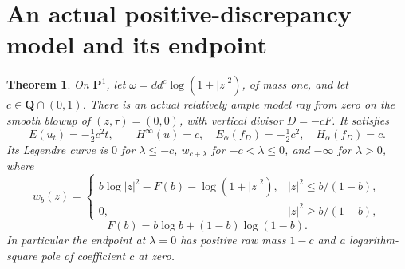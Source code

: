 \documentclass[11pt]{article}
\newcommand{\ddc}{dd^c}
\newtheorem{theorem}{Theorem}
\theoremstyle{remark}\newtheorem{remark}[theorem]{Remark}
\begin{document}
\section{An actual positive-discrepancy model and its endpoint}\label{sec:explicit}
\begin{theorem}\label{thm:explicit}
On $\mathbf P^1$, let $\omega=\ddc\log(1+|z|^2)$, of mass one,
and let $c\in\mathbf Q\cap(0,1)$. There is an actual relatively
ample model ray from zero on the smooth blowup of $(z,\tau)=(0,0)$,
with vertical divisor $D=-cF$. It satisfies
\[
 E(u_t)=-\tfrac12c^2t,\qquad H^\infty(u)=c,
 \quad E_\alpha(f_D)=-\tfrac12c^2,\quad H_\alpha(f_D)=c.
\]
Its Legendre curve is $0$ for $\lambda\leq-c$, $w_{c+\lambda}$
for $-c<\lambda\leq0$, and $-\infty$ for $\lambda>0$, where
\[
 w_b(z)=\begin{cases}
 b\log|z|^2-F(b)-\log(1+|z|^2),&|z|^2\leq b/(1-b),\\
 0,&|z|^2\geq b/(1-b),
 \end{cases}
\]
\[
 F(b)=b\log b+(1-b)\log(1-b).
\]
In particular the endpoint at $\lambda=0$ has positive raw mass
$1-c$ and a logarithm-square pole of coefficient $c$ at zero.
\end{theorem}
\end{document}
